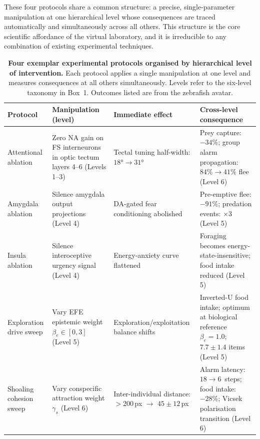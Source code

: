 \documentclass[12pt,a4paper]{article}
\begin{document}
These four protocols share a common structure: a precise,
single-parameter manipulation at one hierarchical level whose
consequences are traced automatically and simultaneously across
all others.
This structure is the core scientific affordance of the virtual
laboratory, and it is irreducible to any combination of existing
experimental techniques.


\begin{table}[h!]
\caption{%
  \textbf{Four exemplar experimental protocols organised by
  hierarchical level of intervention.}
  Each protocol applies a single manipulation at one level and
  measures consequences at all others simultaneously.
  Levels refer to the six-level taxonomy in Box~1.
  Outcomes listed are from the zebrafish avatar.
}
\label{tab:protocols}
\renewcommand{\arraystretch}{1.4}
\small
\begin{tabularx}{\linewidth}{@{} p{2.8cm} p{3.5cm} X X @{}}
\toprule
\textbf{Protocol} &
\textbf{Manipulation (level)} &
\textbf{Immediate effect} &
\textbf{Cross-level consequence} \\
\midrule

Attentional ablation &
  Zero NA gain on FS interneurons in optic tectum layers 4--6
  (Levels 1--3) &
  Tectal tuning half-width: $18° \to 31°$ &
  Prey capture: $-34\%$; group alarm propagation:
  $84\% \to 41\%$ flee (Level 6) \\

Amygdala ablation &
  Silence amygdala output projections (Level 4) &
  DA-gated fear conditioning abolished &
  Pre-emptive flee: $-91\%$; predation events: $\times 3$
  (Level 5) \\

Insula ablation &
  Silence interoceptive urgency signal (Level 4) &
  Energy-anxiety curve flattened &
  Foraging becomes energy-state-insensitive; food
  intake reduced (Level 5) \\

Exploration drive sweep &
  Vary EFE epistemic weight $\beta_e \in [0, 3]$
  (Level 5) &
  Exploration/exploitation balance shifts &
  Inverted-U food intake; optimum at biological
  reference $\beta_e = 1.0$; $7.7 \pm 1.4$ items (Level 5) \\

Shoaling cohesion sweep &
  Vary conspecific attraction weight $\gamma_s$
  (Level 6) &
  Inter-individual distance: $>$200\,px $\to$
  $45 \pm 12$\,px &
  Alarm latency: $18 \to 6$~steps; food intake:
  $-28\%$; Vicsek polarisation transition (Level 6) \\

\bottomrule
\end{tabularx}
\end{table}
\end{document}
